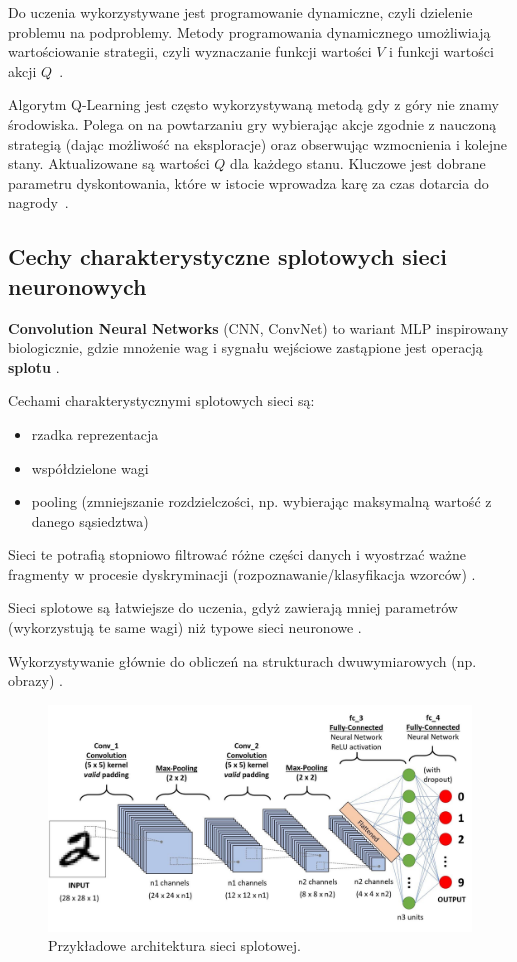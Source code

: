 \documentclass[wi]{zut}
\begin{document}
Do uczenia wykorzystywane jest programowanie dynamiczne, czyli dzielenie problemu na podproblemy. Metody programowania dynamicznego umożliwiają wartościowanie strategii, czyli wyznaczanie funkcji wartości $V$ i funkcji wartości akcji $Q$~\cite{Pluto}.

Algorytm Q-Learning jest często wykorzystywaną metodą gdy z góry nie znamy środowiska. Polega on na powtarzaniu gry wybierając akcje zgodnie z nauczoną strategią (dając możliwość na eksploracje) oraz obserwując wzmocnienia i kolejne stany. Aktualizowane są wartości $Q$ dla każdego stanu. Kluczowe jest dobrane parametru dyskontowania, które w istocie wprowadza karę za czas dotarcia do nagrody~\cite{Pluto}.

\subsection{Cechy charakterystyczne splotowych sieci neuronowych}

\textbf{Convolution Neural Networks} (CNN, ConvNet) to wariant MLP inspirowany biologicznie, gdzie mnożenie wag i sygnału wejściowe zastąpione jest operacją \textbf{splotu} \cite{Forczmanski2020}.

Cechami charakterystycznymi splotowych sieci są:

\begin{itemize}
    \item rzadka reprezentacja
    \item współdzielone wagi
    \item pooling (zmniejszanie rozdzielczości, np. wybierając maksymalną wartość z danego sąsiedztwa)
\end{itemize}

Sieci te potrafią stopniowo filtrować różne części danych i wyostrzać ważne fragmenty w procesie dyskryminacji (rozpoznawanie/klasyfikacja wzorców) \cite{Forczmanski2020}.

Sieci splotowe są łatwiejsze do uczenia, gdyż zawierają mniej parametrów (wykorzystują te same wagi) niż typowe sieci neuronowe \cite{Forczmanski2020}. 

Wykorzystywanie głównie do obliczeń na strukturach dwuwymiarowych (np. obrazy) \cite{Forczmanski2020}.

\begin{figure}[H]
    \centering
    \includegraphics[width=0.7\linewidth]{images/cnn.jpeg}
    \caption{Przykładowe architektura sieci splotowej.}
    \label{fig:cnn}
\end{figure}
\end{document}
